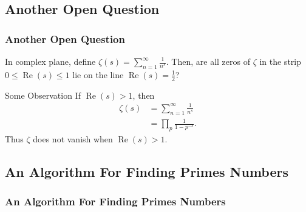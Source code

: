 \documentclass{beamer}
\def\Re#1{\operatorname{Re}\left(#1\right)}
\begin{document}
\subsection{Another Open Question}

\begin{frame}
    \frametitle{Another Open Question}

    In complex plane, define $\zeta(s)=\sum\limits_{n=1}^\infty\frac1{n^s}$. Then, are all zeros of $\zeta$ in the strip $0\leq\Re{s}\leq1$ lie on the line $\Re{s}=\frac12$?
    \pause

    \begin{block}{Some Observation}
        If $\Re{s}>1$\pause, then
        \begin{align*}
            \zeta(s)&=\sum_{n=1}^\infty\frac1{n^s}\\
            &=\prod_p\frac1{1-p^{-s}}.
        \end{align*}
        \pause
       Thus $\zeta$ does not vanish when $\Re{s}>1$.
    \end{block}
\end{frame}

\subsection{An Algorithm For Finding Primes Numbers}

\begin{frame}[fragile]
    \frametitle{An Algorithm For Finding Primes Numbers}

    \begin{semiverbatim}
    \end{semiverbatim}

\end{frame}
\end{document}

